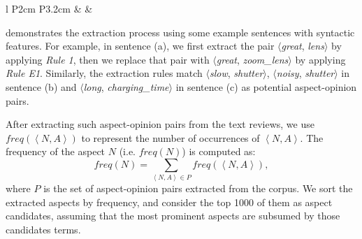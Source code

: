 \begin{table}[th!]
\begin{center}
\begin{tabular}{l P{2cm} P{3.2cm}}
			   &
			  & 
			 \\\hline
		\end{tabular}
	\end{center}
\end{table}









 demonstrates the extraction process using
some example sentences with syntactic features. 
For example, in sentence (a), we first extract the pair $\langle$\emph{great}, \emph{lens}$\rangle$ by applying \emph{Rule 1}, then we 
replace that pair with $\langle$\emph{great}, \emph{zoom\_lens}$\rangle$
by applying \emph{Rule E1}. 
Similarly, the extraction rules match
$\langle$\emph{slow}, \emph{shutter}$\rangle$, $\langle$\emph{noisy}, \emph{shutter}$\rangle$
in sentence (b) and $\langle$\emph{long}, \emph{charging\_time}$\rangle$ in sentence (c) as potential aspect-opinion pairs.

After extracting such aspect-opinion pairs from the text reviews, we use $freq(\left\langle N, A\right\rangle)$ to represent the number
of occurrences of $\left\langle N, A \right\rangle$.
The frequency of the aspect $N$ 
(i.e. $freq(N)$) is computed as: 
\begin{equation}
	freq(N) = \sum\limits_{\left\langle N,A\right\rangle \in P}{freq(\left\langle N, A\right\rangle )},
\end{equation}
where $P$ is the set of aspect-opinion pairs extracted
from the corpus.
We sort the extracted aspects by frequency,
and consider the top 1000 of them
as aspect candidates, assuming that
the most prominent aspects are subsumed by those candidates terms. 


